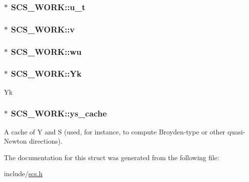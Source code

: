 \hypertarget{struct_s_c_s___w_o_r_k_a199e1e4e48020d89df08be36af7749eb}{
\subsubsection[{u\-\_\-t}]{$\ast$ S\-C\-S\-\_\-\-W\-O\-R\-K\-::u\-\_\-t}}\label{struct_s_c_s___w_o_r_k_a199e1e4e48020d89df08be36af7749eb}
\hypertarget{struct_s_c_s___w_o_r_k_a9549b72c9049c21af513af6c07aecf50}{
\subsubsection[{v}]{$\ast$ S\-C\-S\-\_\-\-W\-O\-R\-K\-::v}}\label{struct_s_c_s___w_o_r_k_a9549b72c9049c21af513af6c07aecf50}
\hypertarget{struct_s_c_s___w_o_r_k_a91d8b48b9f9cbc66223568bf8a5b09d4}{
\subsubsection[{wu}]{$\ast$ S\-C\-S\-\_\-\-W\-O\-R\-K\-::wu}}\label{struct_s_c_s___w_o_r_k_a91d8b48b9f9cbc66223568bf8a5b09d4}
\hypertarget{struct_s_c_s___w_o_r_k_a8fd4206b5c374331f6b0653209a0b1be}{
\subsubsection[{Yk}]{$\ast$ S\-C\-S\-\_\-\-W\-O\-R\-K\-::\-Yk}}\label{struct_s_c_s___w_o_r_k_a8fd4206b5c374331f6b0653209a0b1be}
Yk \hypertarget{struct_s_c_s___w_o_r_k_a55d13515e64b71b28a4f8528e0c73f5e}{
\subsubsection[{ys\-\_\-cache}]{$\ast$ S\-C\-S\-\_\-\-W\-O\-R\-K\-::ys\-\_\-cache}}\label{struct_s_c_s___w_o_r_k_a55d13515e64b71b28a4f8528e0c73f5e}
A cache of Y and S (used, for instance, to compute Broyden-\/type or other quasi-\/\-Newton directions). 

The documentation for this struct was generated from the following file\-:\begin{DoxyCompactItemize}
\item 
include/\hyperlink{scs_8h}{scs.\-h}\end{DoxyCompactItemize}
